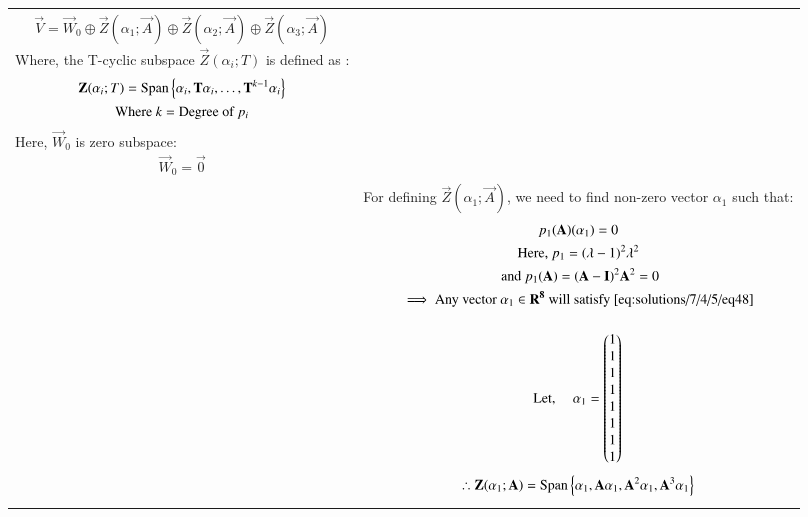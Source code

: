 \begin{longtable}{|p{4cm}|p{14cm}|}
		\begin{gather}
            \vec{V}=\vec{W}_0\oplus \vec{Z}(\alpha_1;\vec{A})\oplus \vec{Z}(\alpha_2;\vec{A})\oplus \vec{Z}(\alpha_3;\vec{A})
        \end{gather}
        Where, the T-cyclic subspace $\vec{Z}(\alpha_i;T)$ is defined as :
	    \begin{gather}
	    \vec{Z}(\alpha_i;T)=\text{Span}\cbrak{\alpha_i,\vec{T}\alpha_i,\hdots,\vec{T}^{k-1}\alpha_i}\\
	    \text{Where }k=\text{Degree of $p_i$}
	    \end{gather}
        Here, $\vec{W}_0$ is zero subspace:
        \begin{gather}
             \vec{W}_0=\vec{0} 
        \end{gather}\\
        &For defining $\vec{Z}(\alpha_1;\vec{A})$, we need to find non-zero vector $\alpha_1$ such that: 
        \begin{gather}
        p_1(\vec{A})(\alpha_1)=0 \label{eq:solutions/7/4/5/eq48}\\
        \text{Here, }p_1=(\lambda-1)^2\lambda^2 \\
        \text{ and } p_1(\vec{A})=(\vec{A}-\vec{I})^2\vec{A}^2=0\\
        \implies \text{Any vector $\alpha_1 \in \vec{R^8}$ will satisfy $\eqref{eq:solutions/7/4/5/eq48}$} \nonumber
        \end{gather}\\
        &\begin{gather}
        \text{Let,  } \quad \alpha_1=\myvec{1\\1\\1\\1\\1\\1\\1\\1}
        \end{gather}
        \begin{gather}
        \therefore \vec{Z}(\alpha_1;\vec{A})=\text{Span}\cbrak{\alpha_1,\vec{A}\alpha_1,\vec{A}^{2}\alpha_1,\vec{A}^{3}\alpha_1}\\

\end{gather}
\end{longtable}
